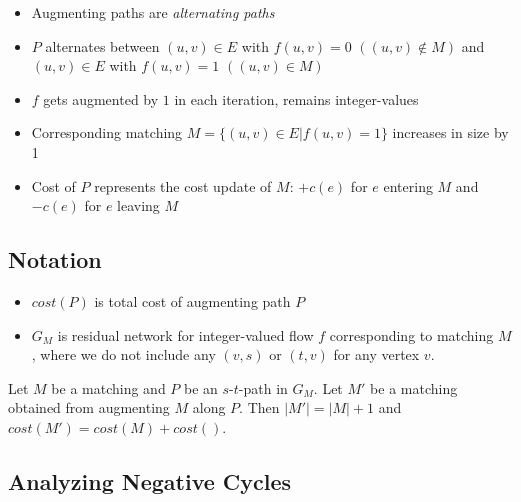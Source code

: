 \begin{itemize}
\item Augmenting paths are \emph{alternating paths}
\item $P$ alternates between $(u,v)\in E$ with $f(u,v) = 0$ $((u,v) \notin M)$ and $(u,v)\in E$ with $f(u,v) = 1$ $((u,v) \in M)$
\item $f$ gets augmented by $1$ in each iteration, remains integer-values
\item Corresponding matching $M = \{ (u,v) \in E | f(u,v) = 1\}$ increases in size by 1
\item Cost of $P$ represents the cost update of $M$: $+c(e)$ for $e$ entering $M$ and $-c(e)$ for $e$ leaving $M$
\end{itemize}

\subsection{Notation}

\begin{itemize}
\item ${cost}(P)$ is total cost of augmenting path $P$
\item $G_M$ is residual network for integer-valued flow $f$ corresponding to matching $M$, where we do not include any $(v,s)$ or $(t,v)$ for any vertex $v$.
\end{itemize}

\begin{mylemma}
Let $M$ be a matching and $P$ be an $s$-$t$-path in $G_M$. Let $M'$ be a matching obtained from augmenting $M$ along $P$. Then $|M'| = |M| + 1$ and ${cost}(M') = {cost}(M) + {cost}()$.
\end{mylemma}

\subsection{Analyzing Negative Cycles}


